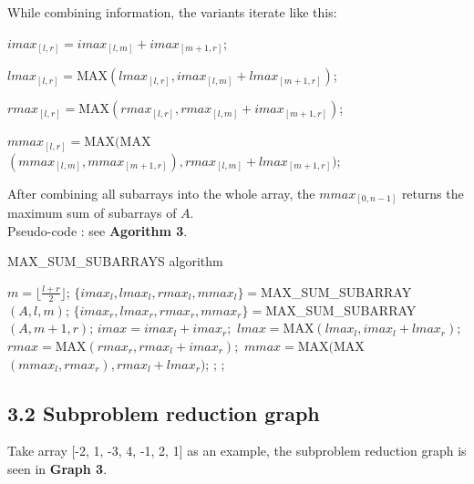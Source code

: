 \documentclass[UTF8]{ctexart}
\begin{document}
While combining information, the variants iterate like this:

$imax_{[l,r]} = imax_{[l,m]} + imax_{[m+1,r]}$;

$lmax_{[l,r]} = $MAX$(lmax_{[l,r]}, imax_{[l,m]} + lmax_{[m+1,r]})$;

$rmax_{[l,r]} = $MAX$(rmax_{[l,r]}, rmax_{[l,m]} + imax_{[m+1,r]})$;

$mmax_{[l,r]} = $MAX$($MAX$(mmax_{[l,m]}, mmax_{[m+1,r]}), rmax_{[l,m]} + lmax_{[m+1,r]})$;

After combining all subarrays into the whole array, the $mmax_{[0,n-1]}$ returns the maximum sum of subarrays of $A$.\\

Pseudo-code : see \textbf{Agorithm 3}.

\begin{algorithm}[h]
	\caption{MAX\_SUM\_SUBARRAYS algorithm}
	\begin{algorithmic}[1]
			\State $m = \lfloor \frac{l+r}{2} \rfloor$; 
			\State $\{imax_l, lmax_l, rmax_l, mmax_l\} =  $MAX\_SUM\_SUBARRAY$(A, l , m)$; 
			\State $\{imax_r, lmax_r, rmax_r, mmax_r\} =  $MAX\_SUM\_SUBARRAY$(A, m+1 , r)$;
			\State $imax = imax_l + imax_r;$
			\State $lmax = $MAX$(lmax_l, imax_l + lmax_r);$ 
			\State $rmax = $MAX$(rmax_r, rmax_l + imax_r);$
			\State $mmax = $MAX$($MAX$(mmax_l, rmax_r), rmax_l + lmax_r)$;
			\State {} ;
		\EndWhile
		\EndFunction
		\State {};
		\EndFunction
	\end{algorithmic}
\end{algorithm}

\subsection*{3.2 Subproblem reduction graph} 
Take array [-2, 1, -3, 4, -1, 2, 1] as an example, the subproblem reduction graph is seen in \textbf{Graph 3}.
\end{document}
